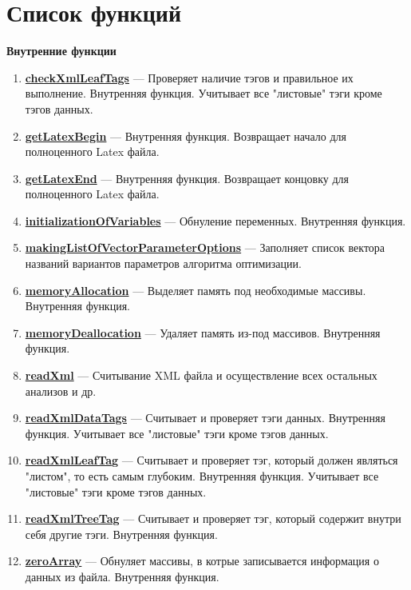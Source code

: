 \newpage
\section{Список функций}\label{section_listfunctions}
\textbf{Внутренние функции}
\begin{enumerate}

\item \textbf{\hyperref[checkXmlLeafTags]{checkXmlLeafTags}} --- Проверяет наличие тэгов и правильное их выполнение. Внутренняя функция. Учитывает все "листовые" тэги кроме тэгов данных.

\item \textbf{\hyperref[getLatexBegin]{getLatexBegin}} --- Внутренняя функция. Возвращает начало для полноценного Latex файла.

\item \textbf{\hyperref[getLatexEnd]{getLatexEnd}} --- Внутренняя функция. Возвращает концовку для полноценного Latex файла.

\item \textbf{\hyperref[initializationOfVariables]{initializationOfVariables}} --- Обнуление переменных. Внутренняя функция.

\item \textbf{\hyperref[makingListOfVectorParameterOptions]{makingListOfVectorParameterOptions}} --- Заполняет список вектора названий вариантов параметров алгоритма оптимизации.

\item \textbf{\hyperref[memoryAllocation]{memoryAllocation}} --- Выделяет память под необходимые массивы. Внутренняя функция.

\item \textbf{\hyperref[memoryDeallocation]{memoryDeallocation}} --- Удаляет память из-под массивов. Внутренняя функция.

\item \textbf{\hyperref[readXml]{readXml}} --- Считывание XML файла и осуществление всех остальных анализов и др.

\item \textbf{\hyperref[readXmlDataTags]{readXmlDataTags}} --- Считывает и проверяет тэги данных. Внутренняя функция. Учитывает все "листовые" тэги кроме тэгов данных.

\item \textbf{\hyperref[readXmlLeafTag]{readXmlLeafTag}} --- Считывает и проверяет тэг, который должен являться "листом", то есть самым глубоким. Внутренняя функция. Учитывает все "листовые" тэги кроме тэгов данных.

\item \textbf{\hyperref[readXmlTreeTag]{readXmlTreeTag}} --- Считывает и проверяет тэг, который содержит внутри себя другие тэги. Внутренняя функция.

\item \textbf{\hyperref[zeroArray]{zeroArray}} --- Обнуляет массивы, в котрые записывается информация о данных из файла. Внутренняя функция.

\end{enumerate}

